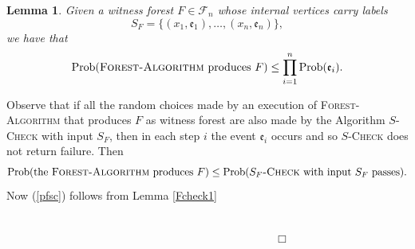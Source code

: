 \documentclass[11pt]{article}
\newtheorem{lem}[theo]{Lemma}
\let\\=\noindent
\let\\=\noindent
\def \red{\textcolor[rgb]{1.00,0.00,0.00}}
\def\prob{{\rm Prob}}
\def\ev{{\mathfrak{e}}}
\def\red{\color{Red}}
\begin{document}
\begin{lem}\label{Fcheck}
Given a witness forest $F\in \mathcal{F}_n$ whose  internal vertices carry labels
$$
S_F=\{(x_1,\ev_1), \dots, (x_n,\ev_{n})\},
$$
we have that
\begin{equation}\label{pfsc}
\prob(\mbox{\textsc{Forest-Algorithm} produces} \ F) \leq \prod_{i=1}^{n} \prob(\ev_i).
\end{equation}
\end{lem}

\\{\it Proof.}
Observe that if all the random choices made by an execution of \textsc{Forest-Algorithm} that produces $F$ as witness forest are also made by the Algorithm \textsc{$S$-Check} with input $S_F$, then in each step $i$ the event $\ev_i$ occurs and so \textsc{$S$-Check} does not return failure. Then
\begin{equation}
\prob(\mbox{the \textsc{Forest-Algorithm} produces  $F$}) \leq \prob(\mbox{\textsc{$S_F$-Check} with input $S_F$ passes}).
\end{equation}
Now (\ref{pfsc}) follows from Lemma \ref{Fcheck1}

~~~~~~~~~~~~~~~~~~~~~~~~~~~~~~~~~~~~~~~~~~~~~~~~~~~~~~~~~~~~~~~~~~~~~~~~~~~~~~~~~~~~~~~~~~~~~~~~~~~~~~~~~~~~~~~~~~~~~~~~$\Box$




\end{document}

